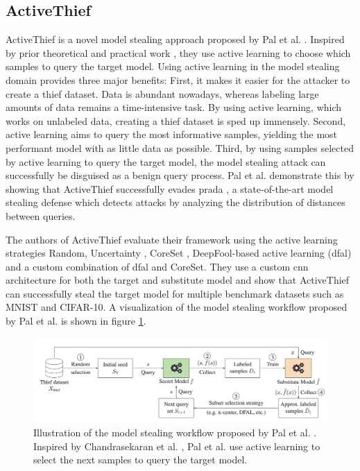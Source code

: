 \subsection{ActiveThief}
\label{sec:Related_work:Model_Stealing:ActiveThief}
ActiveThief is a novel model stealing approach proposed by Pal et al. \cite{pal2020activethief}. Inspired by prior theoretical \cite{chandrasekaran2020exploring}
and practical work \cite{shi2018active}, they use active learning to choose which samples to query the target model. Using active learning in the model stealing
domain provides three major benefits: First, it makes it easier for the attacker to create a thief dataset. Data is abundant nowadays, whereas labeling large amounts
of data remains a time-intensive task. By using active learning, which works on unlabeled data, creating a thief dataset is sped up immensely.
Second, active learning aims to query the most informative samples, yielding the most performant model with as little data as possible. Third, by using samples selected
by active learning to query the target model, the model stealing attack can successfully be disguised as a benign query process. Pal et al. demonstrate this by showing 
that ActiveThief successfully evades \gls{prada} \cite{juuti2019prada}, a state-of-the-art model stealing defense which detects attacks by analyzing the distribution of distances
between queries. \par
The authors of ActiveThief evaluate their framework using the active learning strategies Random, Uncertainty \cite{lewis1995sequential}, CoreSet \cite{sener2017active},
DeepFool-based active learning (\gls{dfal}) \cite{ducoffe2018adversarial} and a custom combination of \gls{dfal} and CoreSet. They use a custom \gls{cnn} architecture
for both the target and substitute model and show that ActiveThief can successfully steal the target model for multiple benchmark datasets such as MNIST and CIFAR-10.
A visualization of the model stealing workflow proposed by Pal et al. is shown in figure \ref{fig:ActiveThief}.

\begin{figure} [ht]
    \centering
    \includegraphics[width=.9\linewidth]{images/ActiveThief_Idea.png}
    \caption[Visualization of ActiveThief]{Illustration of the model stealing workflow proposed by Pal et al. \cite{pal2020activethief}. Inspired by
    Chandrasekaran et al. \cite{chandrasekaran2020exploring}, Pal et al. use active learning to select the next samples to query the target model.}
    \label{fig:ActiveThief}
\end{figure}

